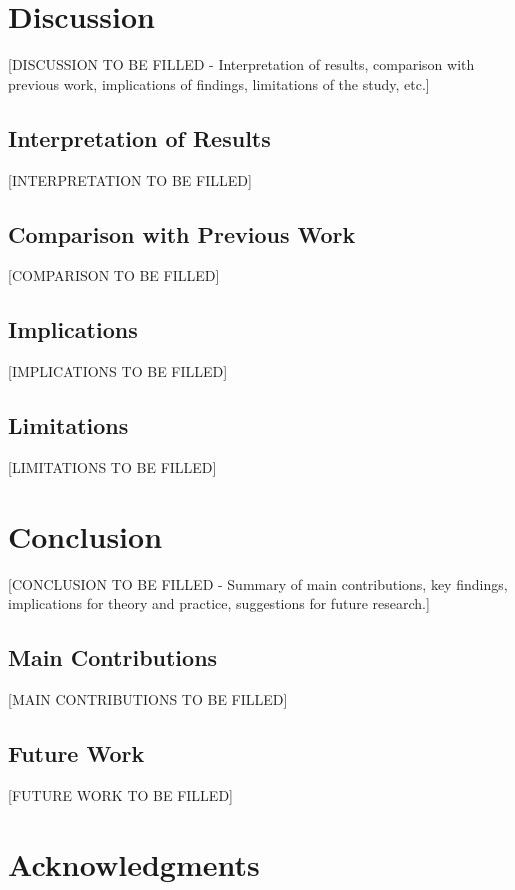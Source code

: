 \documentclass[11pt,a4paper]{article}
\begin{document}
	\section{Discussion}
	
	[DISCUSSION TO BE FILLED - Interpretation of results, comparison with previous work, implications of findings, limitations of the study, etc.]
	
	\subsection{Interpretation of Results}
	[INTERPRETATION TO BE FILLED]
	
	\subsection{Comparison with Previous Work}
	[COMPARISON TO BE FILLED]
	
	\subsection{Implications}
	[IMPLICATIONS TO BE FILLED]
	
	\subsection{Limitations}
	[LIMITATIONS TO BE FILLED]
	
	\section{Conclusion}
	
	[CONCLUSION TO BE FILLED - Summary of main contributions, key findings, implications for theory and practice, suggestions for future research.]
	
	\subsection{Main Contributions}
	[MAIN CONTRIBUTIONS TO BE FILLED]
	
	\subsection{Future Work}
	[FUTURE WORK TO BE FILLED]
	
	\section{Acknowledgments}
	
\end{document}
